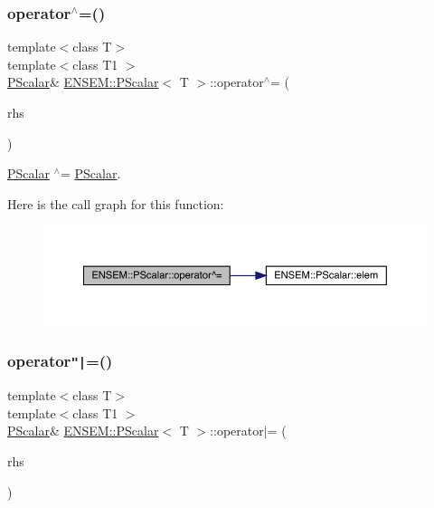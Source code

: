 \subsubsection{\texorpdfstring{operator$^\wedge$=()}{operator^=()}\hspace{0.1cm}{\footnotesize\ttfamily [3/3]}}
{\footnotesize\ttfamily template$<$class T$>$ \\
template$<$class T1 $>$ \\
\mbox{\hyperlink{classENSEM_1_1PScalar}{P\+Scalar}}\& \mbox{\hyperlink{classENSEM_1_1PScalar}{E\+N\+S\+E\+M\+::\+P\+Scalar}}$<$ T $>$\+::operator$^\wedge$= (\begin{DoxyParamCaption}\item[{const \mbox{\hyperlink{classENSEM_1_1PScalar}{P\+Scalar}}$<$ T1 $>$ \&}]{rhs }\end{DoxyParamCaption})\hspace{0.3cm}{\ttfamily [inline]}}



\mbox{\hyperlink{classENSEM_1_1PScalar}{P\+Scalar}} $^\wedge$= \mbox{\hyperlink{classENSEM_1_1PScalar}{P\+Scalar}}. 

Here is the call graph for this function\+:
\nopagebreak
\begin{figure}[H]
\begin{center}
\leavevmode
\includegraphics[width=350pt]{d3/d27/classENSEM_1_1PScalar_a3f256371cc925f01209559addfcbb632_cgraph}
\end{center}
\end{figure}
\mbox{\label{classENSEM_1_1PScalar_a59ee3adbb8dabcfb25aae9f9390dcef0}} 
\subsubsection{\texorpdfstring{operator\texttt{"|}=()}{operator|=()}\hspace{0.1cm}{\footnotesize\ttfamily [1/3]}}
{\footnotesize\ttfamily template$<$class T$>$ \\
template$<$class T1 $>$ \\
\mbox{\hyperlink{classENSEM_1_1PScalar}{P\+Scalar}}\& \mbox{\hyperlink{classENSEM_1_1PScalar}{E\+N\+S\+E\+M\+::\+P\+Scalar}}$<$ T $>$\+::operator$\vert$= (\begin{DoxyParamCaption}\item[{const \mbox{\hyperlink{classENSEM_1_1PScalar}{P\+Scalar}}$<$ T1 $>$ \&}]{rhs }\end{DoxyParamCaption})\hspace{0.3cm}{\ttfamily [inline]}}



